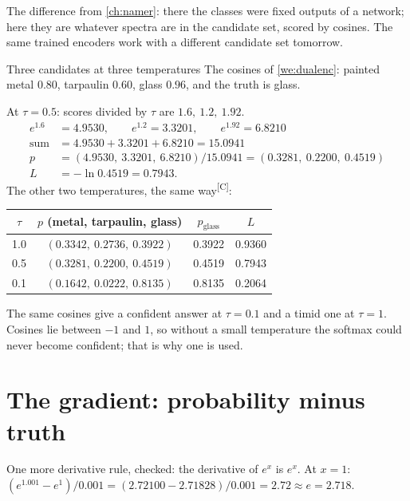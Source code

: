 \documentclass[11pt,a4paper,oneside,openany]{book}
\newcommand{\comp}{\textsuperscript{\textsf{\scriptsize[C]}}}
\begin{document}
The difference from \cref{ch:namer}: there the classes were fixed outputs of a network; here they are whatever spectra are in the candidate set, scored by cosines. The
same trained encoders work with a different candidate set tomorrow.

\begin{worked}[label=we:infonce]{Three candidates at three temperatures}
The cosines of \cref{we:dualenc}: painted metal $0.80$, tarpaulin $0.60$, glass $0.96$, and the truth is glass.

At $\tau=0.5$: scores divided by $\tau$ are $1.6,\ 1.2,\ 1.92$.
\begin{align*}
e^{1.6} &= 4.9530, \qquad e^{1.2}=3.3201, \qquad e^{1.92}=6.8210\\
\text{sum} &= 4.9530+3.3201+6.8210=15.0941\\
p &= (4.9530,\ 3.3201,\ 6.8210)/15.0941=(0.3281,\ 0.2200,\ 0.4519)\\
L &= -\ln0.4519=0.7943 .
\end{align*}
The other two temperatures, the same way\comp:
\begin{center}
\begin{tabular}{@{}cccc@{}}
\toprule
$\tau$ & $p$ (metal, tarpaulin, glass) & $p_{\text{glass}}$ & $L$\\
\midrule
1.0 & $(0.3342,\ 0.2736,\ 0.3922)$ & 0.3922 & 0.9360\\
0.5 & $(0.3281,\ 0.2200,\ 0.4519)$ & 0.4519 & 0.7943\\
0.1 & $(0.1642,\ 0.0222,\ 0.8135)$ & 0.8135 & 0.2064\\
\bottomrule
\end{tabular}
\end{center}
The same cosines give a confident answer at $\tau=0.1$ and a timid one at $\tau=1$. Cosines lie between $-1$ and $1$, so without a small temperature the softmax could never
become confident; that is why one is used.
\end{worked}

\section{The gradient: probability minus truth}

One more derivative rule, checked: the derivative of $e^x$ is $e^x$. At $x=1$: $(e^{1.001}-e^1)/0.001=(2.72100-2.71828)/0.001=2.72\approx e=2.718$.
\end{document}
